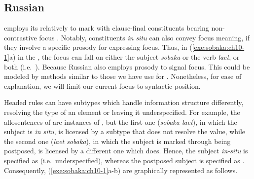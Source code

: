 \subsection{Russian}
\label{9:ssec:rus}


 employs its relatively  to mark
 with clause-final constituents bearing 
non-contrastive focus 
\citep{neeleman:titov:09}. Notably, constituents
\textit{in situ} can also convey focus meaning, if they involve a
specific prosody for expressing focus. Thus, in
(\ref{exe:sobaka:ch10-1}a) in the , the focus
can fall on either the subject \textit{sobaka} or the verb
\textit{laet}, or both (i.e.\ ). Because Russian also
employs prosody to signal focus.  This could be modeled by methods
similar to those we have use for .  Nonetheless, for ease of
explanation, we will limit our current focus to syntactic
position.






Headed rules can have subtypes which handle information structure
differently, resolving the type of an  element or leaving
it underspecified. For example, the  allosentences of
 are instances of , but
the first one (\textit{sobaka laet}), in which the subject is
\textit{in situ}, is licensed by a subtype that does not resolve the
 value, while the second one (\textit{laet
  sobaka}), in which the subject is marked
through being postposed, is licensed by a different one which
does. Hence, the subject \textit{in-situ} is specified as
 (i.e.\ underspecified), whereas the postposed subject
is specified as .  Consequently,
(\ref{exe:sobaka:ch10-1}a-b) are graphically represented as follows.



